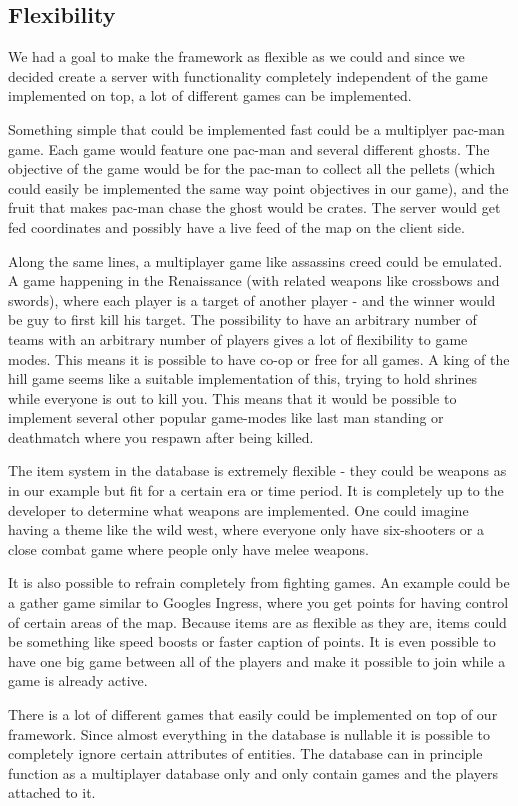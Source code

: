 \subsection{Flexibility}\label{subsec:flex}

We had a goal to make the framework as flexible as we could and since we decided create a server with functionality completely independent of the game implemented on top, a lot of different games can be implemented. 

Something simple that could be implemented fast could be a multiplyer pac-man game. Each game would feature one pac-man and several different ghosts. The objective of the game would be for the pac-man to collect all the pellets (which could easily be implemented the same way point objectives in our game), and the fruit that makes pac-man chase the ghost would be crates. The server would get fed coordinates and possibly have a live feed of the map on the client side.

Along the same lines, a multiplayer game like assassins creed could be emulated. A game happening in the Renaissance (with related weapons like crossbows and swords), where each player is a target of another player - and the winner would be guy to first kill his target. The possibility to have an arbitrary number of teams with an arbitrary number of players gives a lot of flexibility to game modes. This means it is possible to have co-op or free for all games. A king of the hill game seems like a suitable implementation of this, trying to hold shrines while everyone is out to kill you. This means that it would be possible to implement several other popular game-modes like last man standing or deathmatch where you respawn after being killed.

The item system in the database is extremely flexible - they could be weapons as in our example but fit for a certain era or time period. It is completely up to the developer to determine what weapons are implemented. One could imagine having a theme like the wild west, where everyone only have six-shooters or a close combat game where people only have melee weapons. 

It is also possible to refrain completely from fighting games. An example could be a gather game similar to Googles Ingress, where you get points for having control of certain areas of the map. Because items are as flexible as they are, items could be something like speed boosts or faster caption of points. It is even possible to have one big game between all of the players and make it possible to join while a game is already active.

There is a lot of different games that easily could be implemented on top of our framework. Since almost everything in the database is nullable it is possible to completely ignore certain attributes of entities. The database can in principle function as a multiplayer database only and only contain games and the players attached to it.



